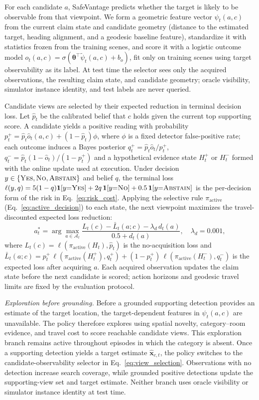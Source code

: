 \documentclass[letterpaper, 10 pt, conference]{ieeeconf}
\newcommand{\method}{SafeVantage}
\begin{document}
For each candidate $a$, \method{} predicts whether the target is likely to
be observable from that viewpoint. We form a geometric feature vector
$\psi_t(a,c)$ from the current claim state and candidate geometry (distance
to the estimated target, heading alignment, and a geodesic baseline
feature), standardize it with statistics frozen from the training scenes,
and score it with a logistic outcome model
$\hat{o}_t(a,c)=\sigma(\boldsymbol{\theta}^{\top}\tilde{\psi}_t(a,c)+b_o)$,
fit only on training scenes using target observability as its label. At test
time the selector sees only the acquired observations, the resulting claim
state, and candidate geometry; oracle visibility, simulator instance
identity, and test labels are never queried.

Candidate views are selected by their expected reduction in terminal
decision loss. Let $\hat{p}_t$ be the calibrated belief that $c$ holds given
the current top supporting score. A candidate yields a positive reading with
probability $p_t^{+}=\hat{p}_t\hat{o}_t(a,c)+(1-\hat{p}_t)\phi$, where $\phi$
is a fixed detector false-positive rate; each outcome induces a Bayes
posterior $q_t^{+}=\hat{p}_t\hat{o}_t/p_t^{+}$,
$q_t^{-}=\hat{p}_t(1-\hat{o}_t)/(1-p_t^{+})$ and a hypothetical evidence
state $H_t^{+}$ or $H_t^{-}$ formed with the online update used at execution.
Under decision $y\in\{\textsc{Yes},\textsc{No},\textsc{Abstain}\}$ and belief
$q$, the terminal loss
$\ell(y,q)=5(1-q)\mathbf{1}[y{=}\textsc{Yes}]+2q\,\mathbf{1}[y{=}\textsc{No}]+0.5\,\mathbf{1}[y{=}\textsc{Abstain}]$
is the per-decision form of the risk in Eq.~\ref{eq:risk_cost}. Applying the
selective rule $\pi_{\mathrm{active}}$ (Eq.~\ref{eq:active_decision}) to each
state, the next viewpoint maximizes the travel-discounted expected loss
reduction:
\begin{equation}
a_t^*=\arg\max_{a\in\mathcal{A}_t}
\frac{L_t(c)-\bar{L}_t(a;c)-\lambda_d\,d_t(a)}{0.5+d_t(a)},
\quad \lambda_d=0.001,
\label{eq:view_selection}
\end{equation}
where $L_t(c)=\ell(\pi_{\mathrm{active}}(H_t),\hat{p}_t)$ is the
no-acquisition loss and
$\bar{L}_t(a;c)=p_t^{+}\,\ell(\pi_{\mathrm{active}}(H_t^{+}),q_t^{+})+(1-p_t^{+})\,\ell(\pi_{\mathrm{active}}(H_t^{-}),q_t^{-})$
is the expected loss after acquiring $a$. Each acquired observation updates
the claim state before the next candidate is scored; action horizons and
geodesic travel limits are fixed by the evaluation protocol.

\noindent\textit{Exploration before grounding.}
Before a grounded supporting detection provides an estimate of the target location, the target-dependent features in $\psi_t(a,c)$ are unavailable. The policy therefore explores using spatial novelty, category--room evidence, and travel cost to score reachable candidate views. This exploration branch remains active throughout episodes in which the category is absent. Once a supporting detection yields a target estimate $\hat{\mathbf{x}}_{c,t}$, the policy switches to the candidate-observability selector in Eq.~\ref{eq:view_selection}. Observations with no detection increase search coverage, while grounded positive detections update the supporting-view set and target estimate. Neither branch uses oracle visibility or simulator instance identity at test time.
\end{document}
